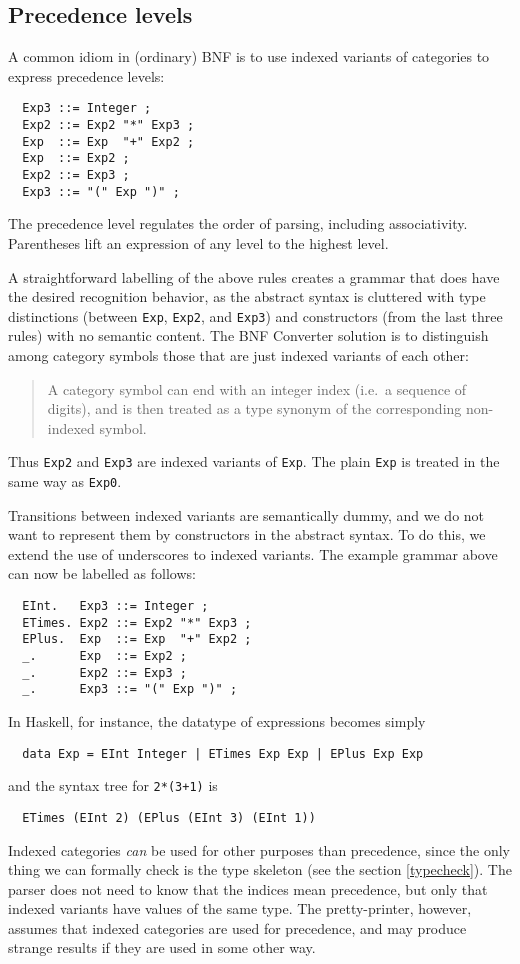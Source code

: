 \documentclass[10pt]{article}
\newcommand{\bequ}{\begin{quote}}
\newcommand{\enqu}{\end{quote}}
\begin{document}
\subsection{Precedence levels}

A common idiom in (ordinary) BNF is to use indexed variants of categories
to express precedence levels:
\begin{verbatim}
  Exp3 ::= Integer ;
  Exp2 ::= Exp2 "*" Exp3 ;
  Exp  ::= Exp  "+" Exp2 ;
  Exp  ::= Exp2 ;
  Exp2 ::= Exp3 ;
  Exp3 ::= "(" Exp ")" ;
\end{verbatim}
The precedence level regulates the order of parsing, including
associativity. Parentheses lift an expression of any level
to the highest level.

A straightforward labelling of the above rules creates a grammar that does
have the desired recognition behavior, as the abstract syntax is cluttered
with type distinctions (between {\tt Exp}, {\tt Exp2}, and {\tt Exp3})
and constructors (from the last three rules) with no semantic content.
The BNF Converter solution is to distinguish among
category symbols those that are just indexed variants of each other:
\bequ
A category symbol can end with an integer index 
(i.e.\ a sequence of digits), and is then treated as a type 
synonym of the corresponding non-indexed symbol.
\enqu
Thus {\tt Exp2} and {\tt Exp3} are indexed variants of {\tt Exp}.
The plain {\tt Exp} is treated in the same way as {\tt Exp0}.

Transitions between indexed variants are
semantically dummy, and we do not want to represent them by
constructors in the abstract syntax. To do this, we extend the use
of underscores to indexed variants.
The example grammar above can now be labelled as follows:
\begin{verbatim}
  EInt.   Exp3 ::= Integer ;
  ETimes. Exp2 ::= Exp2 "*" Exp3 ;
  EPlus.  Exp  ::= Exp  "+" Exp2 ;
  _.      Exp  ::= Exp2 ;
  _.      Exp2 ::= Exp3 ;
  _.      Exp3 ::= "(" Exp ")" ;
\end{verbatim}
In Haskell, for instance, the datatype of expressions becomes simply
\begin{verbatim}
  data Exp = EInt Integer | ETimes Exp Exp | EPlus Exp Exp
\end{verbatim}
and the syntax tree for {\tt 2*(3+1)} is
\begin{verbatim}
  ETimes (EInt 2) (EPlus (EInt 3) (EInt 1))
\end{verbatim}

Indexed categories {\em can} be used for other purposes than 
precedence, since the only thing we can formally check is the
type skeleton (see the section \ref{typecheck}). 
The parser does not need to know
that the indices mean precedence, but only that indexed 
variants have values of the same type.
The pretty-printer, however, assumes that
indexed categories are used for precedence, and may produce
strange results if they are used in some other way.
\end{document}
